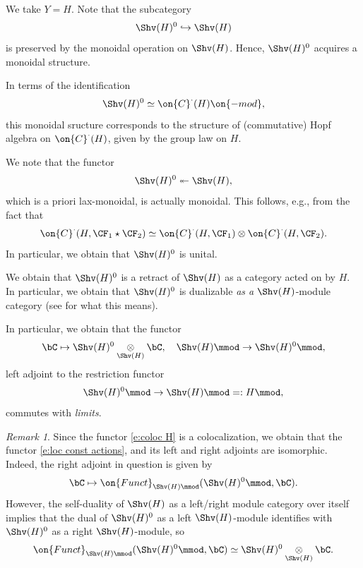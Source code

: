 \documentclass[9pt]{amsart}
\theoremstyle{definition}
\theoremstyle{remark}
\newtheorem{rem}[subsubsection]{Remark}
\numberwithin{equation}{section}
\renewcommand{\mod}{{\on{-mod}}}
\begin{document}
We take $Y=H$. Note that the subcategory 
$$\Shv(H)^0\hookrightarrow \Shv(H)$$
is preserved by the monoidal operation on $\Shv(H)$. Hence, $\Shv(H)^0$ acquires a monoidal structure.

\medskip

In terms of the identification
$$\Shv(H)^0\simeq \on{C}^\cdot(H)\mod,$$
this monoidal sructure corresponds to the structure of (commutative) Hopf algebra on $\on{C}^\cdot(H)$, given by the
group law on $H$.

\medskip

We note that the functor
\begin{equation} \label{e:coloc H}
\Shv(H)^0\twoheadleftarrow \Shv(H),
\end{equation} 
which is a priori lax-monoidal, is actually monoidal. This follows, e.g., from the fact that
$$\on{C}^\cdot(H,\CF_1\star \CF_2)\simeq \on{C}^\cdot(H,\CF_1)\otimes \on{C}^\cdot(H,\CF_2).$$
In particular, we obtain that $\Shv(H)^0$ is unital.

\sssec{}  \label{sss:loc const limits}

We obtain that $\Shv(H)^0$ is a retract of $\Shv(H)$ as a category acted on by $H$. In particular, we 
obtain that $\Shv(H)^0$ is dualizable \emph{as a $\Shv(H)$}-module category (see \cite[Chapter 1, Sect. 8.6]{GR1} for what this means).

\medskip

In particular, we obtain that the functor 
$$\bC\mapsto \Shv(H)^0\underset{\Shv(H)}\otimes \bC, \quad  \Shv(H)\mmod\to  \Shv(H)^0\mmod,$$
left adjoint to the restriction functor 
\begin{equation} \label{e:loc const actions}
\Shv(H)^0\mmod\to \Shv(H)\mmod=:H\mmod,
\end{equation}
commutes with \emph{limits}. 

\begin{rem}
Since the functor \eqref{e:coloc H} is a colocalization, we obtain that the functor \eqref{e:loc const actions},
and its left and right adjoints are isomorphic. Indeed, the right adjoint in question is given by
$$\bC\mapsto \on{Funct}_{\Shv(H)\mmod}(\Shv(H)^0\mmod,\bC).$$
However, the self-duality of $\Shv(H)$ as a left/right module category over itself implies that the dual of 
$\Shv(H)^0$ as a left $\Shv(H)$-module identifies with $\Shv(H)^0$ as a right $\Shv(H)$-module, so
\begin{equation} \label{e:ten with H0}
\on{Funct}_{\Shv(H)\mmod}(\Shv(H)^0\mmod,\bC)\simeq \Shv(H)^0\underset{\Shv(H)}\otimes \bC.
\end{equation}
\end{rem}
\end{document}

